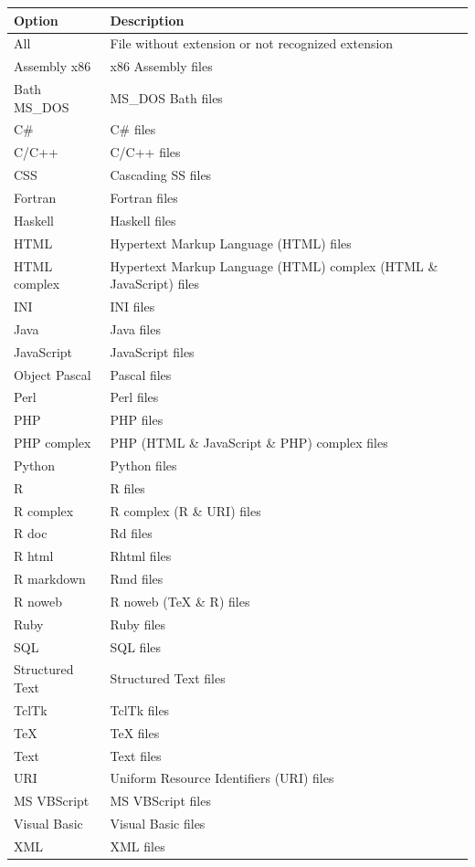 \begin{scriptsize}
  \begin{tabularx}{\textwidth}{>{\hsize=0.2\hsize}X>{\hsize=0.8\hsize}X}\\
    \hline
    \textbf{Option} & \textbf{Description} \\
    \hline
    All & File without extension or not recognized extension \\
    Assembly x86 & x86 Assembly files \\
    Bath MS\_DOS & MS\_DOS Bath files \\
    C\# & C\# files \\
    C/C++ & C/C++ files \\
    CSS & Cascading SS files \\
    Fortran & Fortran files \\
    Haskell & Haskell files \\
    HTML & Hypertext Markup Language (HTML) files \\
    HTML complex & Hypertext Markup Language (HTML) complex (HTML \& JavaScript) files \\
    INI & INI files \\
    Java & Java files \\
    JavaScript & JavaScript files \\
    Object Pascal & Pascal files \\
    Perl & Perl files \\
    PHP & PHP files \\
    PHP complex & PHP (HTML \& JavaScript \& PHP) complex files \\
    Python & Python files \\
    R & R files \\
    R complex & R complex (R \& URI) files \\
    R doc & Rd files \\
    R html & Rhtml files \\
    R markdown & Rmd files \\
    R noweb & R noweb (TeX \& R) files \\
    Ruby & Ruby files \\
    SQL & SQL files \\
    Structured Text & Structured Text files \\
    TclTk & TclTk files \\
    TeX & TeX files \\
    Text & Text files \\
    URI & Uniform Resource Identifiers (URI) files \\
    MS VBScript & MS VBScript files \\
    Visual Basic & Visual Basic files \\
    XML & XML files \\
    \hline
  \end{tabularx}
\end{scriptsize}

